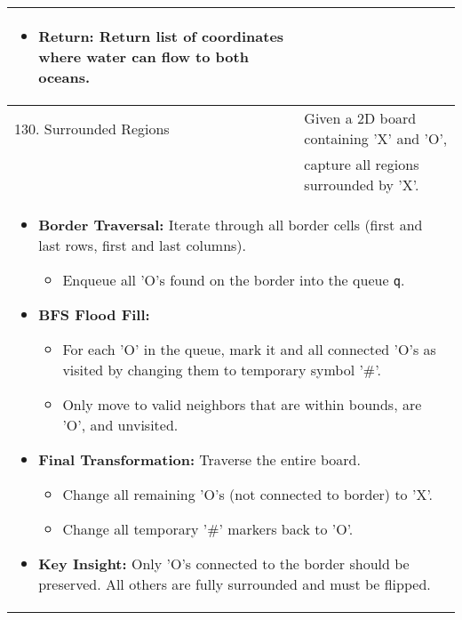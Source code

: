 \begin{summary}
\begin{center}
\begin{tabular}{ll}
{\begin{itemize}
                    \item \textbf{Return:} Return list of coordinates where water can flow to both oceans.
                \end{itemize}                             
            } \\
            \midrule
            130. Surrounded Regions & Given a 2D board containing 'X' and 'O', \\
            & capture all regions surrounded by 'X'. \\
            \multicolumn{2}{p{\linewidth}}{
                \begin{itemize}                
                    \item \textbf{Border Traversal:} Iterate through all border cells (first and last rows, first and last columns).
                    \begin{itemize}
                        \item Enqueue all 'O's found on the border into the queue \texttt{q}.
                    \end{itemize}
                
                    \item \textbf{BFS Flood Fill:}
                    \begin{itemize}
                        \item For each 'O' in the queue, mark it and all connected 'O's as visited by changing them to temporary symbol '\#'.
                        \item Only move to valid neighbors that are within bounds, are 'O', and unvisited.
                    \end{itemize}
                
                    \item \textbf{Final Transformation:} Traverse the entire board.
                    \begin{itemize}
                        \item Change all remaining 'O's (not connected to border) to 'X'.
                        \item Change all temporary '\#' markers back to 'O'.
                    \end{itemize}
                
                    \item \textbf{Key Insight:} Only 'O's connected to the border should be preserved. All others are fully surrounded and must be flipped.
                \end{itemize}                             
            } \\
            \bottomrule
        \end{tabular}
    \end{center}
\end{summary}
\newpage


